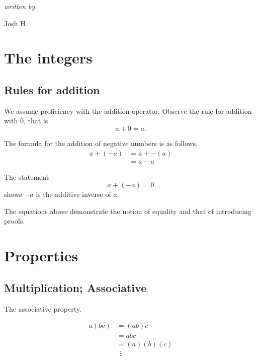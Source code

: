 \documentclass{amsbook}
\begin{document}
	\begin{titlepage}
		\centering
		\Huge{} \par \vspace{8cm}
		\small{\textit{written by}} \par
		\Large{Josh H}
	\end{titlepage}

\chapter{The integers}
\section{Rules for addition}
	We assume proficiency with the addition operator.
	Observe the rule for addition with $0$, that is
	\begin{equation} \label{eq:adding_zero}
		a + 0 = a.
	\end{equation}

	The formula for the addition of negative numbers is as follows,
	\begin{equation} \label{eq:adding_negatives}
	\begin{split}
		a + (-a) 	&= a + -(a) \\
					&= a - a
	\end{split}
	\end{equation}

	The statement
	\begin{equation} \label{eq:additive_inverse}
		a + (-a) = 0
	\end{equation}
	shows $-a$ is the additive inverse of $a$.
	
	The equations above demonstrate the notion of equality and that of
	introducing proofs.
	
\chapter{Properties}
\section{Multiplication; Associative}
	The associative property.

	\begin{align*}
		a(bc) 	&= (ab)c		\\
				&= abc			\\
				&= (a)(b)(c)	\\
				&\hspace{5pt} \vdots
	\end{align*}
\end{document}
